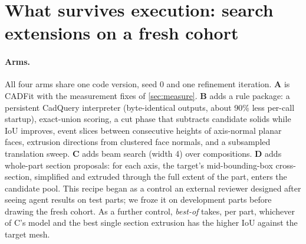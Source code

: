 \section{What survives execution: search extensions on a fresh cohort}
\label{sec:search}

\paragraph{Arms.}
All four arms share one code version, seed 0 and one refinement iteration. \textbf{A} is CADFit with the measurement fixes of \cref{sec:measure}. \textbf{B} adds a rule package: a persistent CadQuery interpreter (byte-identical outputs, about 90\% less per-call startup), exact-union scoring, a cut phase that subtracts candidate solids while IoU improves, event slices between consecutive heights of axis-normal planar faces, extrusion directions from clustered face normals, and a subsampled translation sweep. \textbf{C} adds beam search (width 4) over compositions. \textbf{D} adds whole-part section proposals: for each axis, the target's mid-bounding-box cross-section, simplified and extruded through the full extent of the part, enters the candidate pool. This recipe began as a control an external reviewer designed after seeing agent results on test parts; we froze it on development parts before drawing the fresh cohort. As a further control, \emph{best-of} takes, per part, whichever of C's model and the best single section extrusion has the higher IoU against the target mesh.

